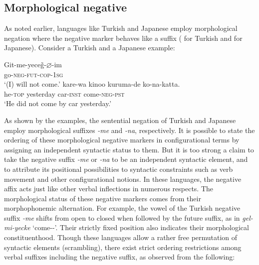 \documentclass[output=paper
                ,modfonts
                ,nonflat
	        ,collection
	        ,collectionchapter
	        ,collectiontoclongg
 	        ,biblatex
                ,babelshorthands
                ,newtxmath
                ,draftmode
                ,colorlinks, citecolor=brown
]{./langsci/langscibook}
\begin{document}
{\begin{exe}
\begin{xlist}
\begin{exe}
\begin{xlist}
%

\section{Morphological negative}

As noted earlier, languages like Turkish and Japanese employ morphological negation where the negative marker behaves like a suffix (\citealt[]{kelepir} for
Turkish and \citealt{Kato:97,Kato:00} for Japanese). Consider
a Turkish and a Japanese example:

\eal
\ex
\label{negation-turkish-jap}
\gll Git-me-yece\~{g}-$\varnothing$-im \\
     go-\textsc{neg-fut-cop}-\textsc{1sg} \\
\glt `(I) will not come.'
\ex
\gll kare-wa kinoo kuruma-de ko-na-katta. \\
     he-\textsc{top} yesterday car-\textsc{inst} come-\textsc{neg}-\textsc{pst} \\
\glt `He did not come by car yesterday.'
\zl

\noindent
As shown by the examples, the sentential negation of Turkish
and Japanese employ
morphological suffixes \textit{-me} and \textit{-na},
respectively.
It is possible to state the ordering
of these morphological negative markers in configurational
terms by assigning an independent syntactic status to them.
But it is too strong a claim to
take the negative suffix \textit{-me} or \textit{-na}  to be an independent syntactic element,
and to attribute its positional possibilities to syntactic constraints
such as verb movement and other configurational notions.
%
In these languages, the negative affix acts just like
other verbal inflections in numerous respects.
%
%
%
%
%
The morphological status of
these negative markers comes from their morphophonemic alternation.
For example, the vowel of the Turkish negative suffix \textit{-me} shifts from open to closed when followed by the
future suffix, as in \textit{gel-mi-yecke} `come-\NEG-\FUT'.  Their
strictly fixed position also indicates their morphological
constituenthood. Though these languages allow a rather free permutation of
syntactic elements (scrambling), there exist strict ordering restrictions among
verbal suffixes including the negative suffix, as observed from the following:


\end{xlist}
\end{exe}
\end{xlist}
\end{exe}}
\end{document}
